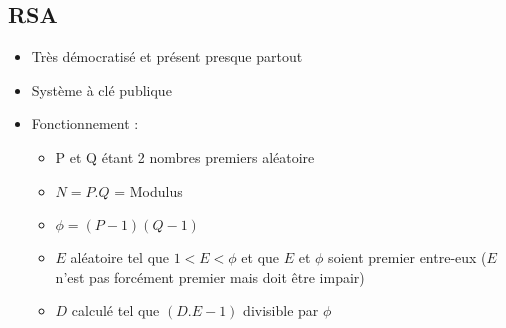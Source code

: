 \documentclass[a4paper]{article}
\begin{document}
\subsection{RSA}
\begin{itemize}[label=\textbullet, font=\Large]
    \item Très démocratisé et présent presque partout
    \item Système à clé publique
    \item Fonctionnement :
    \begin{itemize}[label=, font=\scriptsize]
        \item P et Q étant 2 nombres premiers aléatoire
        \item $N = P.Q$ = Modulus
        \item $\phi = (P-1)(Q-1)$
        \item $E$ aléatoire tel que $1 < E < \phi$ et que $E$ et $\phi$ soient premier entre-eux ($E$ n'est pas forcément premier mais doit être impair)
        \item $D$ calculé tel que $(D.E - 1)$ divisible par $\phi$
        \begin{itemize}


\end{itemize}
\end{itemize}
\end{itemize}
\end{document}

